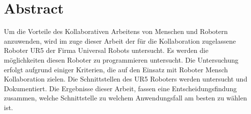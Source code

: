 \section*{Abstract}
\label{abstract}
Um die Vorteile des Kollaborativen Arbeitens von Menschen und Robotern anzuwenden, wird im zuge dieser Arbeit der für die Kollaboration zugelassene Roboter UR5 der Firma Universal Robots untersucht. Es werden die möglichkeiten diesen Roboter zu programmieren untersucht. Die Untersuchung erfolgt aufgrund einiger Kriterien, die auf den Einsatz mit Roboter Mensch Kollaboration zielen.
Die Schnittstellen des UR5 Roboters werden untersucht und Dokumentiert.
Die Ergebnisse dieser Arbeit, fassen eine Entscheidungsfindung zusammen, welche Schnittstelle zu welchem Anwendungsfall am besten zu wählen ist.